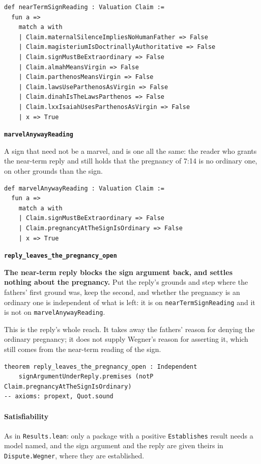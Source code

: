 \documentclass[11pt]{article}
\begin{document}
{\small\begin{verbatim}
def nearTermSignReading : Valuation Claim :=
  fun a =>
    match a with
    | Claim.maternalSilenceImpliesNoHumanFather => False
    | Claim.magisteriumIsDoctrinallyAuthoritative => False
    | Claim.signMustBeExtraordinary => False
    | Claim.almahMeansVirgin => False
    | Claim.parthenosMeansVirgin => False
    | Claim.lawsUseParthenosAsVirgin => False
    | Claim.dinahIsTheLawsParthenos => False
    | Claim.lxxIsaiahUsesParthenosAsVirgin => False
    | x => True
\end{verbatim}}
\par\medskip\noindent\textbf{\texttt{marvel\allowbreak{}Anyway\allowbreak{}Reading}}\par\nobreak\noindent
A sign that need not be a marvel, and is one all the same: the reader who grants the near-term reply and still holds that the pregnancy of 7:14 is no ordinary one, on other grounds than the sign.

{\small\begin{verbatim}
def marvelAnywayReading : Valuation Claim :=
  fun a =>
    match a with
    | Claim.signMustBeExtraordinary => False
    | Claim.pregnancyAtTheSignIsOrdinary => False
    | x => True
\end{verbatim}}
\par\medskip\noindent\textbf{\texttt{reply\_\allowbreak{}leaves\_\allowbreak{}the\_\allowbreak{}pregnancy\_\allowbreak{}open}}\par\nobreak\noindent
\textbf{The near-term reply blocks the sign argument back, and settles nothing about the pregnancy.} Put the reply’s grounds and step where the fathers’ first ground was, keep the second, and whether the pregnancy is an ordinary one is independent of what is left: it is on \texttt{near\allowbreak{}Term\allowbreak{}Sign\allowbreak{}Reading} and it is not on \texttt{marvel\allowbreak{}Anyway\allowbreak{}Reading}.

This is the reply’s whole reach. It takes away the fathers’ reason for denying the ordinary pregnancy; it does not supply Wegner’s reason for asserting it, which still comes from the near-term reading of the sign.

{\small\begin{verbatim}
theorem reply_leaves_the_pregnancy_open : Independent
    signArgumentUnderReply.premises (notP Claim.pregnancyAtTheSignIsOrdinary)
-- axioms: propext, Quot.sound
\end{verbatim}}
\paragraph*{Satisfiability}
\leavevmode\par\nobreak
As in \texttt{Results.lean}: only a package with a positive \texttt{Establishes} result needs a model named, and the sign argument and the reply are given theirs in \texttt{Dispute.Wegner}, where they are established.
\end{document}
